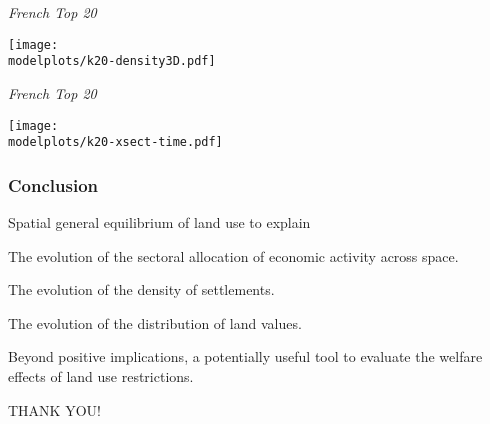\documentclass[aspectratio=169]{beamer}
\begin{document}
\begin{frame}{\emph{French Top 20}}

	\begin{adjustbox}{center}
		\texttt{[image: \\modelplots/k20-density3D.pdf]}
	\end{adjustbox}

\end{frame}

\begin{frame}{\emph{French Top 20}}

	\begin{adjustbox}{center}
		\texttt{[image: \\modelplots/k20-xsect-time.pdf]}
	\end{adjustbox}

\end{frame}



\begin{frame}
\frametitle{Conclusion}

\bi
\item Spatial general equilibrium of land use to explain
\smallskip

\bi\item The evolution of the sectoral allocation of economic activity across space.
\smallskip
\item The evolution of the density of settlements.
\smallskip
\item The evolution of the distribution of land values.
\ei
\bigskip
\item Beyond positive implications, a potentially useful tool to evaluate the welfare effects of land use restrictions.\ei

\bigskip
\begin{center}
  THANK YOU!
\end{center}
\end{frame}

\beginbackup

\end{document}
